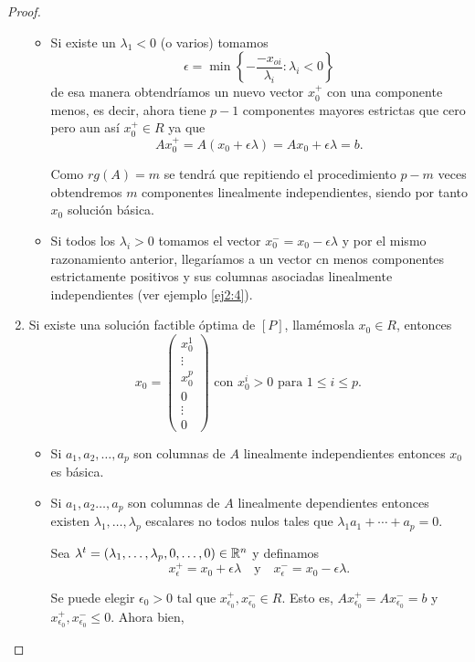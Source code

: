 \begin{proof}
\begin{enumerate}
    \begin{itemize}
      \item Si existe un $\lambda_1<0$ (o varios) tomamos $$\epsilon=\min\left\{-\dfrac{-x_{oi}}{\lambda_i}: \lambda_i<0\right\}$$
      de esa manera obtendríamos un nuevo vector $x_0^+$ con una componente menos, es decir, ahora tiene $p-1$ componentes mayores estrictas que cero pero aun así $x_0^+\in R$ ya que
      $$Ax_0^+=A(x_0+\epsilon\lambda)=Ax_0+\epsilon\lambda=b.$$
      
      Como $rg(A)=m$ se tendrá que repitiendo el procedimiento $p-m$ veces obtendremos $m$ componentes linealmente independientes, siendo por tanto $x_0$ solución básica.
                                                        
      \item Si todos los $\lambda_i>0$ tomamos el vector $x_0^-=x_0-\epsilon\lambda$ y por el mismo razonamiento anterior, llegaríamos a un vector cn menos componentes estrictamente positivos y sus columnas asociadas linealmente independientes (ver ejemplo \ref{ej2:4}).
    \end{itemize}
    
    \item Si existe una solución factible óptima de $[P]$, llamémosla $x_0\in R$, entonces
    $$x_0=\left(
      \begin{array}{c}
        x_0^1\\\vdots\\x_0^p\\0\\\vdots\\0
      \end{array}
    \right)\text{ con } x_0^i>0 \text{ para }1\le i\le p.$$
    
    \begin{itemize}
      \item Si $a_1,a_2,\dots,a_p$ son columnas de $A$ linealmente independientes entonces $x_0$ es básica.
      \item Si $a_1,a_2\dots,a_p$ son columnas de $A$ linealmente dependientes entonces existen $\lambda_1,\dots,\lambda_p$ escalares no todos nulos tales que $\lambda_1 a_1+\cdots + a_p=0$.
      
      Sea $\lambda^t=(\lambda_1,\dots,\lambda_p,0,\dots,0)\in\mathbb R^n$ y definamos
      $$x_\epsilon^+=x_0+\epsilon\lambda\quad\text{y}\quad x_\epsilon^-=x_0-\epsilon\lambda.$$
      
      Se puede elegir $\epsilon_0>0$ tal que $x_{\epsilon_0}^+,x_{\epsilon_0}^-\in R$. Esto es, $Ax_{\epsilon_0}^+=Ax_{\epsilon_0}^-=b$ y $x_{\epsilon_0}^+,x_{\epsilon_0}^-\le0$. Ahora bien,
      

\end{itemize}
\end{enumerate}
\end{proof}

